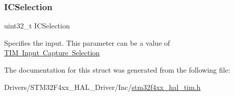 \subsubsection{\texorpdfstring{I\+C\+Selection}{ICSelection}}
{\footnotesize\ttfamily uint32\+\_\+t I\+C\+Selection}

Specifies the input. This parameter can be a value of \mbox{\hyperlink{group___t_i_m___input___capture___selection}{T\+IM Input Capture Selection}} 

The documentation for this struct was generated from the following file\+:\begin{DoxyCompactItemize}
\item 
Drivers/\+S\+T\+M32\+F4xx\+\_\+\+H\+A\+L\+\_\+\+Driver/\+Inc/\mbox{\hyperlink{stm32f4xx__hal__tim_8h}{stm32f4xx\+\_\+hal\+\_\+tim.\+h}}\end{DoxyCompactItemize}
